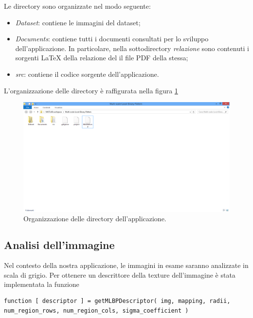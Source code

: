 \pagebreak

Le directory sono organizzate nel modo seguente:

\begin{itemize}
	\item \textit{Dataset}: contiene le immagini del dataset;
	\item \textit{Documents}: contiene tutti i documenti consultati per lo sviluppo dell'applicazione. In particolare, nella sottodirectory \textit{relazione} sono contenuti i sorgenti LaTeX della relazione del il file PDF della stessa;
	\item \textit{src}: contiene il codice sorgente dell'applicazione.
\end{itemize}

L'organizzazione delle directory è raffigurata nella figura \ref{fig:orgDir}

\begin{figure}[ht]
\begin{center}
\includegraphics[width=.95\textwidth]{img/organizzazione_Cartelle}
\caption{Organizzazione delle directory dell'applicazione.}
\label{fig:orgDir}
\end{center}
\end{figure}

\pagebreak

\subsection{Analisi dell'immagine}
\label{imp:analisi}
Nel contesto della nostra applicazione, le immagini in esame saranno analizzate in scala di grigio.
Per ottenere un descrittore della texture dell'immagine è stata implementata la funzione

\begin{lstlisting}
function [ descriptor ] = getMLBPDescriptor( img, mapping, radii, num_region_rows, num_region_cols, sigma_coefficient )
\end{lstlisting}

